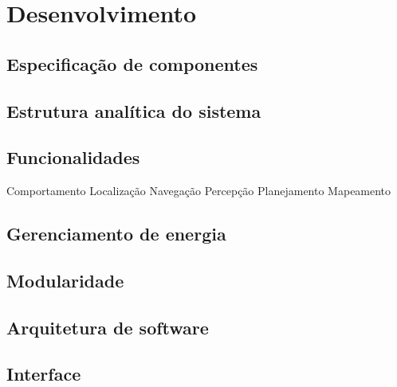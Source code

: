 \chapter{Desenvolvimento}
\label{chap:desenv}
\lipsum[1]



\section{Especificação de componentes}
\label{sec:espec}
\lipsum[1]

\section{Estrutura analítica do sistema}
\label{sec:eap}
\lipsum[1]

\section{Funcionalidades}
\label{sec:func}
\lipsum[2-4]

Comportamento
Localização
Navegação
Percepção
Planejamento
Mapeamento


\section{Gerenciamento de energia}
\label{sec:gerenc-eng}
\lipsum[2-4]



\section{Modularidade}
\label{sec:modular}
\lipsum[2-4]


\section{Arquitetura de software}
\label{sec:arq-sof}
\lipsum[2-4]




\section{Interface}
\label{sec:interface}
\lipsum[2-4]







